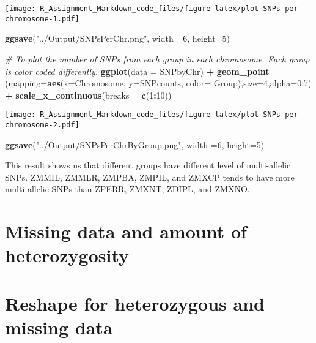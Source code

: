 \documentclass[]{article}
\newenvironment{Shaded}{\begin{snugshade}}{\end{snugshade}}
\newcommand{\KeywordTok}[1]{\textcolor[rgb]{0.13,0.29,0.53}{\textbf{#1}}}
\newcommand{\DataTypeTok}[1]{\textcolor[rgb]{0.13,0.29,0.53}{#1}}
\newcommand{\DecValTok}[1]{\textcolor[rgb]{0.00,0.00,0.81}{#1}}
\newcommand{\FloatTok}[1]{\textcolor[rgb]{0.00,0.00,0.81}{#1}}
\newcommand{\StringTok}[1]{\textcolor[rgb]{0.31,0.60,0.02}{#1}}
\newcommand{\CommentTok}[1]{\textcolor[rgb]{0.56,0.35,0.01}{\textit{#1}}}
\newcommand{\OperatorTok}[1]{\textcolor[rgb]{0.81,0.36,0.00}{\textbf{#1}}}
\newcommand{\NormalTok}[1]{#1}
\begin{document}
\texttt{[image: R\_Assignment\_Markdown\_code\_files/figure-latex/plot SNPs per chromosome-1.pdf]}

\begin{Shaded}
\begin{Highlighting}[]
\KeywordTok{ggsave}\NormalTok{(}\StringTok{"../Output/SNPsPerChr.png"}\NormalTok{, }\DataTypeTok{width =}\DecValTok{6}\NormalTok{, }\DataTypeTok{height=}\DecValTok{5}\NormalTok{)}

\CommentTok{# To plot the number of SNPs from each group in each chromosome. Each group is color coded differently.}
\KeywordTok{ggplot}\NormalTok{(}\DataTypeTok{data =}\NormalTok{ SNPbyChr) }\OperatorTok{+}\StringTok{ }\KeywordTok{geom_point}\NormalTok{ (}\DataTypeTok{mapping=}\KeywordTok{aes}\NormalTok{(}\DataTypeTok{x=}\NormalTok{Chromosome, }\DataTypeTok{y=}\NormalTok{SNPcounts, }\DataTypeTok{color=}\NormalTok{ Group),}\DataTypeTok{size=}\DecValTok{4}\NormalTok{,}\DataTypeTok{alpha=}\FloatTok{0.7}\NormalTok{) }\OperatorTok{+}\StringTok{ }\KeywordTok{scale_x_continuous}\NormalTok{(}\DataTypeTok{breaks =} \KeywordTok{c}\NormalTok{(}\DecValTok{1}\OperatorTok{:}\DecValTok{10}\NormalTok{))}
\end{Highlighting}
\end{Shaded}

\texttt{[image: R\_Assignment\_Markdown\_code\_files/figure-latex/plot SNPs per chromosome-2.pdf]}

\begin{Shaded}
\begin{Highlighting}[]
\KeywordTok{ggsave}\NormalTok{(}\StringTok{"../Output/SNPsPerChrByGroup.png"}\NormalTok{, }\DataTypeTok{width =}\DecValTok{6}\NormalTok{, }\DataTypeTok{height=}\DecValTok{5}\NormalTok{)}
\end{Highlighting}
\end{Shaded}

This result shows us that different groups have different level of
multi-allelic SNPs. ZMMIL, ZMMLR, ZMPBA, ZMPIL, and ZMXCP tends to have
more multi-allelic SNPs than ZPERR, ZMXNT, ZDIPL, and ZMXNO.

\section{Missing data and amount of
heterozygosity}\label{missing-data-and-amount-of-heterozygosity}

\section{Reshape for heterozygous and missing
data}\label{reshape-for-heterozygous-and-missing-data}
\end{document}
